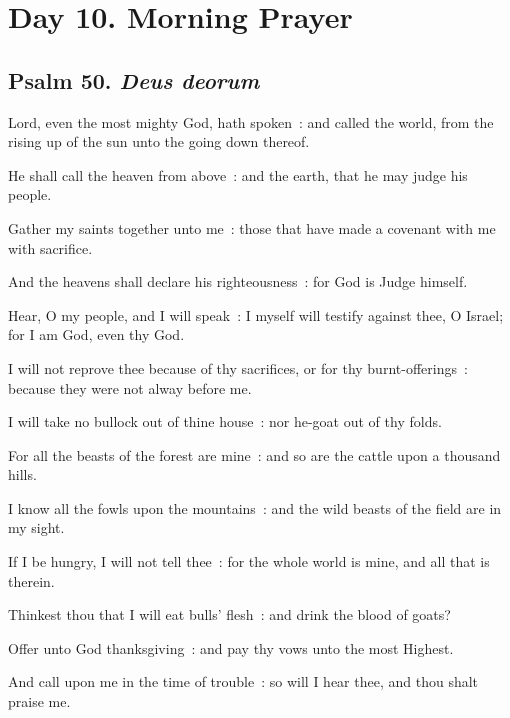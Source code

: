 \clearpage
\section*{Day 10. Morning Prayer}

\subsection{Psalm 50. \textit{Deus deorum}}

 Lord, even the most mighty God, hath spoken~: and called the world, from the rising up of the sun unto the going down thereof.\par
{}
He shall call the heaven from above~: and the earth, that he may judge his people.\par
{}Gather my saints together unto me~: those that have made a covenant with me with sacrifice.\par
{}And the heavens shall declare his righteousness~: for God is Judge himself.\par
{}Hear, O my people, and I will speak~: I myself will testify against thee, O Israel; for I am God, even thy God.\par
{}I will not reprove thee because of thy sacrifices, or for thy burnt-offerings~: because they were not alway before me.\par
{}I will take no bullock out of thine house~: nor he-goat out of thy folds.\par
{}For all the beasts of the forest are mine~: and so are the cattle upon a thousand hills.\par
{}I know all the fowls upon the mountains~: and the wild beasts of the field are in my sight.\par
{}If I be hungry, I will not tell thee~: for the whole world is mine, and all that is therein.\par
{}Thinkest thou that I will eat bulls' flesh~: and drink the blood of goats?\par
{}Offer unto God thanksgiving~: and pay thy vows unto the most Highest.\par
{}And call upon me in the time of trouble~: so will I hear thee, and thou shalt praise me.\par
